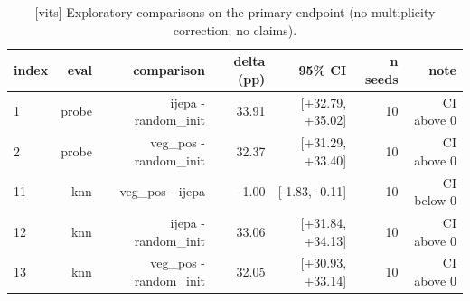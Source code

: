 \begin{table}[t]
\centering
\small
\caption{[vits] Exploratory comparisons on the primary endpoint (no multiplicity correction; no claims).}
\label{tab:exploratory_comparisons}
\begin{tabular}{lrrrrrr}
\toprule
index & eval & comparison & delta (pp) & 95\% CI & n seeds & note \\
\midrule
1 & probe & ijepa - random\_init & 33.91 & [+32.79, +35.02] & 10 & CI above 0 \\
2 & probe & veg\_pos - random\_init & 32.37 & [+31.29, +33.40] & 10 & CI above 0 \\
11 & knn & veg\_pos - ijepa & -1.00 & [-1.83, -0.11] & 10 & CI below 0 \\
12 & knn & ijepa - random\_init & 33.06 & [+31.84, +34.13] & 10 & CI above 0 \\
13 & knn & veg\_pos - random\_init & 32.05 & [+30.93, +33.14] & 10 & CI above 0 \\
\bottomrule
\end{tabular}
\end{table}

